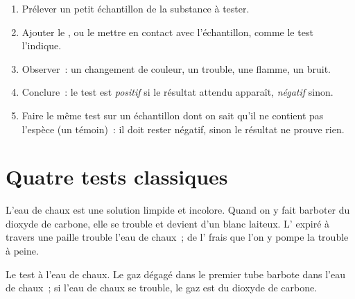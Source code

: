 \begin{method}\label{met:g7:identifying-substances:run}
\begin{enumerate}
  \item Prélever un petit échantillon de la substance à tester.
  \item Ajouter le , ou le mettre en contact avec l'échantillon,
        comme le test l'indique.
  \item Observer~: un changement de couleur, un trouble, une flamme, un
        bruit.
  \item Conclure~: le test est \emph{positif} si le résultat attendu
        apparaît, \emph{négatif} sinon.
  \item Faire le même test sur un échantillon dont on sait qu'il ne
        contient pas l'espèce (un témoin)~: il doit rester négatif, sinon
        le résultat ne prouve rien.
\end{enumerate}
\end{method}

\section{Quatre tests classiques}

\begin{proposition}\label{prop:g7:identifying-substances:limewater}
L'eau de chaux est une solution limpide et incolore. Quand on y fait
barboter du dioxyde de carbone, elle se trouble et devient d'un blanc
laiteux. L' expiré à travers une paille trouble l'eau de chaux~; de
l' frais que l'on y pompe la trouble à peine.
\end{proposition}

\begin{omfigure}

{\small Le test à l'eau de chaux. Le gaz dégagé dans le premier tube
barbote dans l'eau de chaux~; si l'eau de chaux se trouble, le gaz est
du dioxyde de carbone.}
\end{omfigure}

